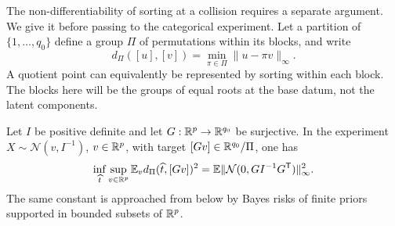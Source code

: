 The non-differentiability of sorting at a collision requires a separate
argument. We give it before passing to the categorical experiment.
Let a partition of $\{1,\ldots,q_0\}$ define a group $\Pi$ of
permutations within its blocks, and write
\[
 d_\Pi([u],[v])=\min_{\pi\in\Pi}\|u-\pi v\|_\infty.
\]
A quotient point can equivalently be represented by sorting within each
block. The blocks here will be the groups of equal roots at the base
datum, not the latent components.

\begin{lemma}\label{lem:gaussian-quotient}
Let $I$ be positive definite and let $G:\mathbb R^p\to\mathbb R^{q_0}$ be
surjective. In the experiment $X\sim\mathcal N(v,I^{-1})$, $v\in\mathbb R^p$,
with target $[Gv]\in\mathbb R^{q_0}/\Pi$, one has
\begin{equation}\label{eq:gaussian-quotient-risk}
 \inf_{\widehat t}\sup_{v\in\mathbb R^p}
      \mathbb E_v d_\Pi(\widehat t,[Gv])^2
       =\mathbb E\|\mathcal N(0,GI^{-1}G^{\mathsf T})\|_\infty^2.
\end{equation}
The same constant is approached from below by Bayes risks of finite
priors supported in bounded subsets of $\mathbb R^p$.
\end{lemma}
